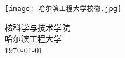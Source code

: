 \begin{titlepage}
    \begin{center}
        \vspace*{4cm}


        \vspace{1.5cm}


        \vfill

        \vspace{2.8cm}

        \texttt{[image: 哈尔滨工程大学校徽.jpg]}

        \vspace{1.8cm}


        \LARGE 核科学与技术学院\\
        \Large 哈尔滨工程大学\\
        \vspace{0.5cm}
        \today

    \end{center}
\end{titlepage}